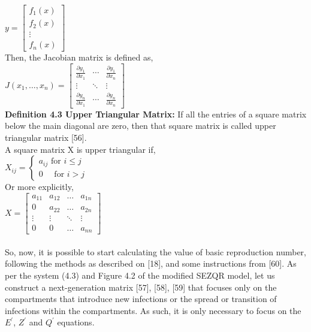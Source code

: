 $
y=\left[\begin{array}{c}
f_{1}(x) \\
f_{2}(x) \\
\vdots \\
f_{n}(x)
\end{array}\right]
$
\\

\noindent Then, the Jacobian matrix is defined as, \\

$
J\left(x_{1}, \ldots, x_{n}\right)=\left[\begin{array}{ccc}
\frac{\partial y_{1}}{\partial x_{1}} & \cdots & \frac{\partial y_{1}}{\partial x_{n}} \\
\vdots & \ddots & \vdots \\
\frac{\partial y_{n}}{\partial x_{1}} & \cdots & \frac{\partial y_{n}}{\partial x_{n}}
\end{array}\right]
$
\\

\textbf{Definition 4.3 Upper Triangular Matrix:  } If all the entries of a square matrix below the main diagonal are zero, then that square matrix is called upper triangular matrix [56]. \\

\noindent A square matrix X is upper triangular if, \\

$
X_{i j}=\left\{\begin{array}{cc}
a_{i j}  \text { for } i \leq j \\
0 \quad \text { for } i>j
\end{array}\right.
$
\\

\noindent Or more explicitly, \\

$
X=\left[\begin{array}{cccc}
a_{11} & a_{12} & \ldots & a_{1 n} \\
0 & a_{22} & \ldots & a_{2 n} \\
\vdots & \vdots & \ddots & \vdots \\
0 & 0 & \ldots & a_{n n}
\end{array}\right]
$
\\
\\

So, now, it is possible to start calculating the value of basic reproduction number, following the methods as described on [18], and some instructions from [60]. As per the system (4.3) and Figure 4.2 of the modified SEZQR model, let us construct a next-generation matrix [57], [58], [59] that focuses only on the compartments that introduce new infections or the spread or transition of infections within the compartments. As such, it is only necessary to focus on the $E^\prime$, $Z^\prime$ and $Q^\prime$ equations. \\

